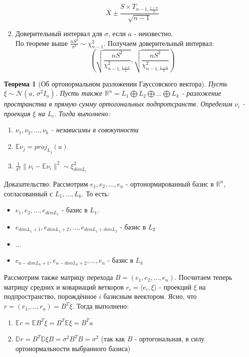 \documentclass[a4paper,12pt]{article}
\newcommand{\expec}{\mathbb{E}}
\newcommand{\disp}{\mathbb{D}}
\newcommand{\normal}[2]{\mathcal{N}(#1,\,#2)}
\newcommand{\R}{\mathbb{R}}
\theoremstyle{named}
\newtheorem*{namedtheorem}{Теорема}
\begin{document}
\begin{enumerate}
\begin{equation}
        \overline{X} \pm \frac{S\times T_{n-1, \frac{1+\alpha}{2}}}{\sqrt{n-1}}
        \tag{$\sigma$, $a$ - known}
    \end{equation}
    \item Доверительный интервал для $\sigma$, если $a$ - неизвестно. \\
    По теореме выше $\frac{nS^2}{\sigma^2} \sim \chi^2_{n-1}$. Получаем доверительный интервал:
    \begin{equation}
        \left(\sqrt{\frac{nS^2}{\chi^2_{n-1, \frac{1+\alpha}{2}}}}, \sqrt{\frac{nS^2}{\chi^2_{n-1, \frac{1-\alpha}{2}}}}\right)
        \tag{$a$, $\sigma$ - known}
    \end{equation}
\end{enumerate}
\begin{namedtheorem}[Об ортонормальном разложении Гауссовского вектора]
    Пусть $\xi \sim \normal{a}{\sigma^2 I_n}$. Пусть также $\R^n = L_1 \bigoplus L_2 \bigoplus ... \bigoplus L_k$ - разложение 
    пространства в прямую сумму ортогональных подпротсранств. Определим $\nu_i$ - проекция $\xi$ на $L_i$. Тогда выполнено:
    \begin{enumerate}
        \item $\nu_1, \nu_2, ..., \nu_k$ - независимы в совокупности
        \item $\expec \nu_j = proj_{L_j}(a)$
        \item $\frac{1}{\sigma^2}\|\nu_i - \expec \nu_i \|^2 \sim \xi^2_{dim L_i}$
    \end{enumerate}
\end{namedtheorem}
Доказательство: Рассмотрим $e_1, e_2, ..., e_n$ - ортонормированный базис в $\R^n$, согласованный с $L_1, ..., L_k$. То есть:
\begin{itemize}
    \item $e_1, e_2, ..., e_{dim L_1}$ - базис в $L_1$.
    \item $ e_{dim L_1+1},  e_{dim L_1 + 2}, ..., e_{dim L_1 + dim L_2}$ - базис в $L_2$
    \item ...
    \item $ e_{n - dim L_k + 1},  e_{n - dim L_k + 2}, ..., e_{n}$ - базис в $L_k$
\end{itemize}
Рассмотрим также матрицу перехода $B = (e_1, e_2, ..., e_n)$. Посчитаем теперь матрицу средних и ковариаций веткоров $r_i = \langle e_i, \xi \rangle$ - 
проекций $\xi$ на подпространство, порождённое $i$ базисным веектором. Ясно, что $r = (r_1, ..., r_n) = B^T\xi$. Тогда выполнено:
\begin{enumerate}
    \item $\expec r = \expec B^T \xi = B^T \expec \xi = B^Ta$
    \item $\disp r = B^T \disp \xi B = \sigma^2 B^TB = \sigma^2$ (так как $B$ - ортогональная, в силу ортонормальности выбранного базиса)
\end{enumerate}
\end{document}
